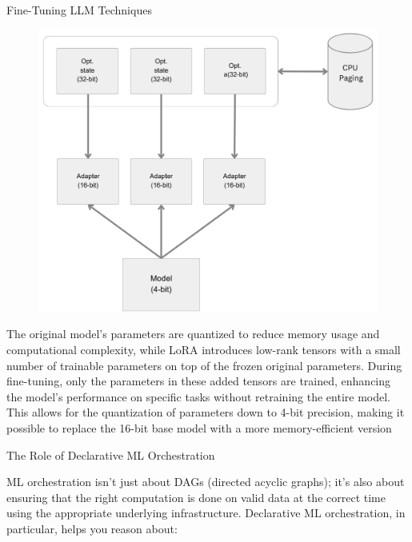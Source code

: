 \documentclass[final]{beamer}
\newlength{\colwidth}
\begin{document}
\begin{frame}[t]
\begin{columns}[t]
\begin{column}{\colwidth}
\begin{block}{Fine-Tuning LLM Techniques}
\begin{minipage}[t]{.30\textwidth}
\begin{figure}[t]
            \includegraphics[width=\textwidth]{logos/qlora.png}
            \centering
            \end{figure}
            \raggedleft
        \end{minipage}  
        \begin{minipage}[t]{.65\textwidth}
            \raggedright
            The original model's parameters are quantized to reduce memory usage and computational complexity, while LoRA introduces low-rank tensors with a small number of trainable parameters on top of the frozen original parameters. During fine-tuning, only the parameters in these added tensors are trained, enhancing the model's performance on specific tasks without retraining the entire model. This allows for the quantization of parameters down to 4-bit precision, making it possible to replace the 16-bit base model with a more memory-efficient version
        \end{minipage}
    \end{block}

    
  \begin{block}{The Role of Declarative ML Orchestration}

        ML orchestration isn’t just about DAGs (directed acyclic graphs); it’s also about ensuring that the right computation is done on valid data at the correct time using the appropriate underlying infrastructure. Declarative ML orchestration, in particular, helps you reason about:
        

\end{block}
\end{column}
\end{columns}
\end{frame}
\end{document}
